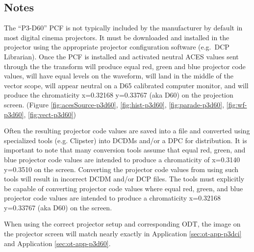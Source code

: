 \subsection{Notes}
\label{subsec:notes-p3d60}

The ``P3-D60'' PCF is not typically included by the manufacturer by
default in most digital cinema projectors. It must be downloaded and
installed in the projector using the appropriate projector configuration
software (e.g.~DCP Librarian). Once the PCF is installed and activated
neutral ACES values sent through the the
\texttt{} transform will produce equal
red, green and blue projector code values, will have equal levels on the
waveform, will land in the middle of the vector scope, will appear
neutral on a D65 calibrated computer monitor, and will produce the
chromaticity x=0.32168 y=0.33767 (aka D60) on the projection screen.
(Figure \ref{fig:acesSource-p3d60}, \ref{fig:hist-p3d60}, \ref{fig:parade-p3d60}, \ref{fig:wf-p3d60}, \ref{fig:vect-p3d60})

Often the resulting projector code values are saved into a file and
converted using specialized tools (e.g. Clipster) into DCDMs and/or a
DPC for distribution. It is important to note that many conversion tools
assume that equal red, green, and blue projector code values are
intended to produce a chromaticity of x=0.3140 y=0.3510 on the screen.
Converting the projector code values from
\texttt{} using such tools will result
in incorrect DCDM and/or DCP files. The tools must explicitly be capable
of converting projector code values where equal red, green, and blue
projector code values are intended to produce a chromaticity x=0.32168
y=0.33767 (aka D60) on the screen.

When using the correct projector setup and corresponding ODT, the image
on the projector screen will match nearly exactly in Application \ref{sec:ot-app-p3dci} and
Application \ref{sec:ot-app-p3d60}.

